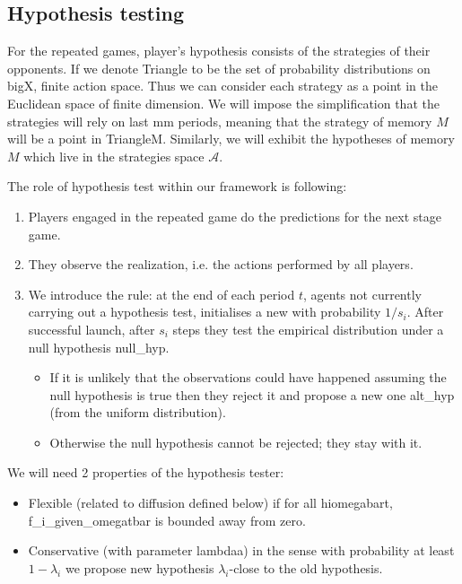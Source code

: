 \documentclass[]{spie}  %
\begin{document}
\subsection{Hypothesis testing}
\label{sec:hypothesis}

For the repeated games, player's hypothesis consists of the strategies of their opponents. If we denote \gls{Triangle} to be the set of probability distributions on \gls{bigX}, finite action space. Thus we can consider each strategy as a point in the Euclidean space of finite dimension. We will impose the simplification that the strategies will rely on last \gls{mm} periods, meaning that the strategy of memory $M$ will be a point in \gls{TriangleM}. Similarly, we will exhibit the hypotheses of memory $M$ which live in the strategies space $\mathcal{A}$.

The role of hypothesis test within our framework is following:
\begin{enumerate}
    \item Players engaged in the repeated game do the predictions for the next stage game.
    \item They observe the realization, i.e. the actions performed by all players.
    \item We introduce the rule: at the end of each period $t$, agents not currently carrying out a hypothesis test, initialises a new with probability $1/s_i$. After successful launch, after $s_i$ steps they test the empirical distribution under a null hypothesis \gls{null_hyp}.     
    \begin{itemize}
        \item If it is unlikely that the observations could have happened assuming the null hypothesis is true then they reject it and propose a new one \gls{alt_hyp} (from the uniform distribution).
        \item Otherwise the null hypothesis cannot be rejected; they stay with it.
    \end{itemize}
\end{enumerate}

We will need 2 properties of the hypothesis tester:
\begin{itemize}
    \item Flexible (related to diffusion defined below) if for all \gls{hiomegabart}, \gls{f_i_given_omegatbar} is bounded away from zero.
    \item Conservative (with parameter \gls{lambdaa}) in the sense with probability at least $1-\lambda_i$ we propose new hypothesis $\lambda_i$-close to the old hypothesis.
\end{itemize}
\end{document}

